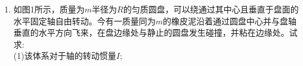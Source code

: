 
\begin{enumerate}
\item 如图1所示，质量为$m$半径为$R$的匀质圆盘，可以绕通过其中心且垂直于盘面的水平固定轴自由转动。今有一质量同为$m$的橡皮泥沿着通过圆盘中心并与盘轴垂直的水平方向飞来，在盘边缘处与静止的圆盘发生碰撞，并粘在边缘处。试求:\\
(1)该体系对于轴的转动惯量$I$;
\end{enumerate}